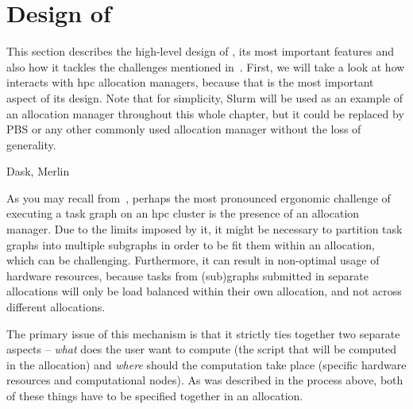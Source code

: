 

\section{Design of \hyperqueue{}}
\label{sec:hq-design}
This section describes the high-level design of \hyperqueue{}, its most important features
and also how it tackles the challenges mentioned in~. First, we will take a
look at how \hyperqueue{} interacts with \gls{hpc} allocation managers,
because that is the most important aspect of its design. Note that for simplicity, Slurm will be
used as an example of an allocation manager throughout this whole chapter, but it could be replaced
by PBS or any other commonly used allocation manager without the loss of generality.

Dask, Merlin

As you may recall from~, perhaps the most pronounced ergonomic challenge of
executing a task graph on an \gls{hpc} cluster is the presence of an allocation
manager. Due to the limits imposed by it, it might be necessary to partition task graphs into
multiple subgraphs in order to be fit them within an allocation, which can be challenging.
Furthermore, it can result in non-optimal usage of hardware resources, because tasks from
(sub)graphs submitted in separate allocations will only be load balanced within their own
allocation, and not across different allocations.

The primary issue of this mechanism is that it strictly ties together two separate aspects --
\emph{what} does the user want to compute (the script that will be computed in the
allocation) and \emph{where} should the computation take place (specific hardware
resources and computational nodes). As was described in the process above, both of these things
have to be specified together in an allocation.

